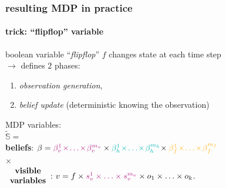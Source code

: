 \documentclass[12pt,svgnames,table]{beamer}
\begin{document}
\begin{frame}
\frametitle{resulting MDP in practice}
\framesubtitle{\footnotesize trick: ``flipflop'' variable}

\begin{block}{}
boolean variable ``\textit{flipflop}'' $f$ 
changes state at each time step\\ 
$\rightarrow$ defines $2$ phases:
\begin{enumerate}
\item \textit{observation generation}, 
\item \textit{belief update} (deterministic knowing the observation) 
\end{enumerate}
\end{block}
MDP variables:\\ 
\vspace{0.3cm}
$\tilde{\mathbb{S}} =$ \\
 \textbf{beliefs}: \hspace{-0.2cm} $\beta = { \color{violet} \beta^1_v \hspace{-0.05cm} \times \hspace{-0.05cm} \ldots \hspace{-0.05cm} \times \hspace{-0.05cm} \beta^{m_v}_v } \times  { \color{gggreen} \beta^1_h \hspace{-0.05cm} \times \hspace{-0.05cm} \ldots \hspace{-0.05cm} \times \hspace{-0.05cm} \beta^{m_h}_h } \hspace{-0.07cm} \times { \color{orangee} \beta^1_f \hspace{-0.05cm} \times \hspace{-0.05cm} \ldots \hspace{-0.05cm} \times \hspace{-0.05cm} \beta^{m_f}_f } $ \\
\vspace{0.15cm}
\hspace{2cm} $\times$ \\
$ \begin{array}{c} \mbox{\textbf{visible}} \\ \mbox{\textbf{variables}} \end{array} $: $v = f \times { \color{violet} s^1_v \times \ldots \times s^{m_v}_v } \times o_1 \times \ldots \times o_{k} $.
\end{frame}
\end{document}
